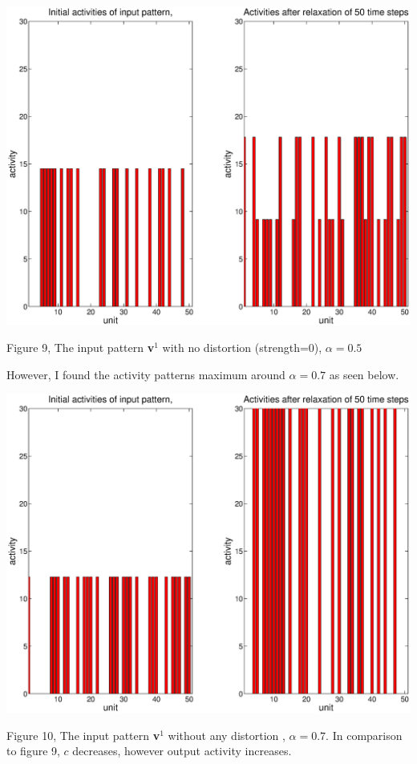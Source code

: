 \documentclass{article}
\begin{document}
 \begin{center}
	\includegraphics[width=\textwidth]{alpha1.eps}
\begin{footnotesize}
 Figure 9, The input pattern \textbf{v}$^1$ with no distortion (strength=0), $\alpha=0.5$ \end{footnotesize}
\end{center}

However, I found the activity patterns maximum around $\alpha=0.7$ as seen below. 

 \begin{center}
	\includegraphics[width=\textwidth]{alpha2.eps}
\begin{footnotesize}
 Figure 10, The input pattern \textbf{v}$^1$ without any distortion , $\alpha=0.7$. In comparison to figure 9, $c$ decreases, however output activity increases. \end{footnotesize}
\end{center} 
\end{document}
